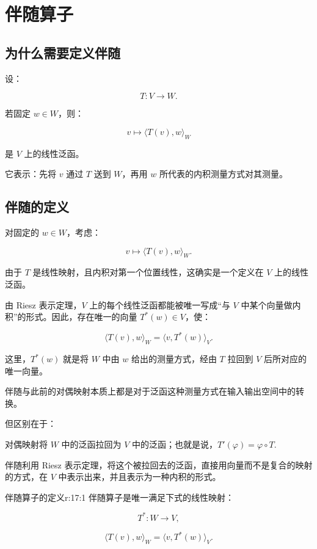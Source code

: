 
\chapter{伴随算子}


\section{为什么需要定义伴随}

设：

\[
T:V\to W.
\]

若固定 $w\in W$，则：

\[
v\mapsto\langle T(v),w\rangle_W
\]

是 $V$ 上的线性泛函。

它表示：先将 $v$ 通过 $T$ 送到 $W$，再用 $w$ 所代表的内积测量方式对其测量。

\section{伴随的定义}

对固定的 $w\in W$，考虑：

\[
v\mapsto\langle T(v),w\rangle_W.
\]

由于 $T$ 是线性映射，且内积对第一个位置线性，这确实是一个定义在 $V$ 上的线性泛函。

由 Riesz 表示定理，$V$ 上的每个线性泛函都能被唯一写成“与 $V$ 中某个向量做内积”的形式。因此，存在唯一的向量 $T^*(w)\in V$，使：

\[
\langle T(v),w\rangle_W
=
\langle v,T^*(w)\rangle_V.
\]

这里，$T^*(w)$ 就是将 $W$ 中由 $w$ 给出的测量方式，经由 $T$ 拉回到 $V$ 后所对应的唯一向量。

伴随与此前的对偶映射本质上都是对于泛函这种测量方式在输入输出空间中的转换。

但区别在于：

\begin{jitem}
\item %
对偶映射将 $W$ 中的泛函拉回为 $V$ 中的泛函；也就是说，$T'(\varphi)=\varphi\circ T.$
\item %
伴随利用 Riesz 表示定理，将这个被拉回去的泛函，直接用向量而不是复合的映射的方式，在 $V$ 中表示出来，并且表示为一种内积的形式。
\end{jitem}

\begin{jdefn}{伴随算子的定义}{r:17:1}
伴随算子是唯一满足下式的线性映射：

\[
T^*:W\to V,
\]

\[
\langle T(v),w\rangle_W
=
\langle v,T^*(w)\rangle_V.
\]
\end{jdefn}

